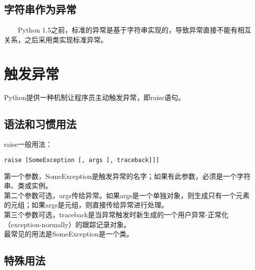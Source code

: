 \documentclass[11pt,a4paper]{article}
\begin{document}
\begin{CJK*}{UTF8}{nsung}
\newpage

\subsection{字符串作为异常}

~~~~Python 1.5之前，标准的异常是基于字符串实现的，导致异常直接不能有相互关系，之后采用类实现标准异常。

\section{触发异常}

Python提供一种机制让程序员主动触发异常，即raise语句。

\subsection{语法和习惯用法}

raise一般用法：
\begin{verbatim}
raise [SomeException [, args [, traceback]]]
\end{verbatim}
第一个参数，SomeException是触发异常的名字；如果有此参数，必须是一个字符串、类或实例。\\
第二个参数可选，args传给异常。如果args是一个单独对象，则生成只有一个元素的元组；如果args是元组，则直接传给异常进行处理。\\
第三个参数可选，traceback是当异常触发时新生成的一个用户异常-正常化（exception-normally）的跟踪记录对象。\\
最常见的用法是SomeException是一个类。

\subsection{特殊用法}


\end{CJK*}
\end{document}
